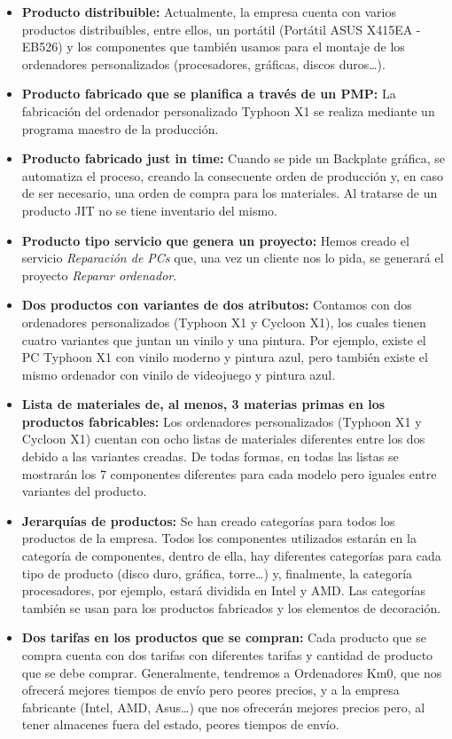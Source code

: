 \begin{itemize}
    \item \textbf{Producto distribuible:} Actualmente, la empresa cuenta con varios productos distribuibles, entre ellos, un portátil (Portátil ASUS X415EA - EB526) y los componentes que también usamos para el montaje de los ordenadores personalizados (procesadores, gráficas, discos duros…).
    \item \textbf{Producto fabricado que se planifica a través de un PMP:} La fabricación del ordenador personalizado Typhoon X1 se realiza mediante un programa maestro de la producción.
    \item \textbf{Producto fabricado just in time:} Cuando se pide un Backplate gráfica, se automatiza el proceso, creando la consecuente orden de producción y, en caso de ser necesario, una orden de compra para los materiales. Al tratarse de un producto JIT no se tiene inventario del mismo.
    \item \textbf{Producto tipo servicio que genera un proyecto:} Hemos creado el servicio \textit{Reparación de PCs} que, una vez un cliente nos lo pida, se generará el proyecto \textit{Reparar ordenador}.
    \item \textbf{Dos productos con variantes de dos atributos:} Contamos con dos ordenadores personalizados (Typhoon X1 y Cycloon X1), los cuales tienen cuatro variantes que juntan un vinilo y una pintura. Por ejemplo, existe el PC Typhoon X1 con vinilo moderno y pintura azul, pero también existe el mismo ordenador con vinilo de videojuego y pintura azul.
    \item \textbf{Lista de materiales de, al menos, 3 materias primas en los productos fabricables:} Los ordenadores personalizados (Typhoon X1 y Cycloon X1) cuentan con ocho listas de materiales diferentes entre los dos debido a las variantes creadas. De todas formas, en todas las listas se mostrarán los 7 componentes diferentes para cada modelo pero iguales entre variantes del producto.
    \item \textbf{Jerarquías de productos:} Se han creado categorías para todos los productos de la empresa. Todos los componentes utilizados estarán en la categoría de componentes, dentro de ella, hay diferentes categorías para cada tipo de producto (disco duro, gráfica, torre…) y, finalmente, la categoría procesadores, por ejemplo, estará dividida en Intel y AMD. Las categorías también se usan para los productos fabricados y los elementos de decoración.
    \item \textbf{Dos tarifas en los productos que se compran:} Cada producto que se compra cuenta con dos tarifas con diferentes tarifas y cantidad de producto que se debe comprar. Generalmente, tendremos a Ordenadores Km0, que nos ofrecerá mejores tiempos de envío pero peores precios, y a la empresa fabricante (Intel, AMD, Asus…) que nos ofrecerán mejores precios pero, al tener almacenes fuera del estado, peores tiempos de envío.

\end{itemize}
